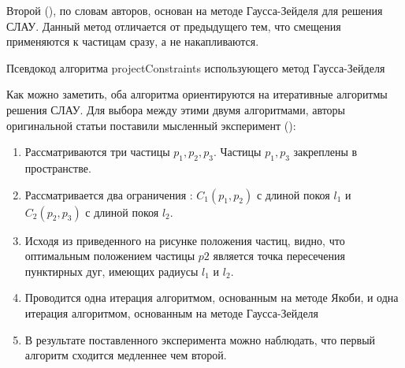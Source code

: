 	Второй (), по словам авторов, основан на методе Гаусса-Зейделя для решения СЛАУ. Данный метод отличается от предыдущего тем, что смещения применяются к частицам сразу, а не накапливаются.

	\begin{algorithm} %
	\nonl{}
	\caption{Псевдокод алгоритма projectConstraints использующего метод Гаусса-Зейделя}\label{alg:projectConstraintsGauss}
	\end{algorithm}
	\FloatBarrier
	
	Как можно заметить, оба алгоритма ориентируются на итеративные алгоритмы решения СЛАУ. Для выбора между этими двумя алгоритмами, авторы оригинальной статьи поставили мысленный эксперимент ():
	
	\begin{enumerate}[1.]
		\item Рассматриваются три частицы $p_1, p_2, p_3$. Частицы $p_1, p_3$ закреплены в пространстве.
		\item Рассматривается два ограничения : $C_1(p_1, p_2)$ с длиной покоя $l_1$ и $C_2(p_2, p_3)$ с длиной покоя $l_2$.
		\item Исходя из приведенного на рисунке положения частиц, видно, что оптимальным положением частицы $p2$ является точка пересечения пунктирных дуг, имеющих радиусы $l_1$ и $l_2$.
		\item Проводится одна итерация алгоритмом, основанным на методе Якоби, и одна итерация алгоритмом, основанным на методе Гаусса-Зейделя
		\item В результате поставленного эксперимента можно наблюдать, что первый алгоритм сходится медленнее чем второй.
	\end{enumerate}
		
